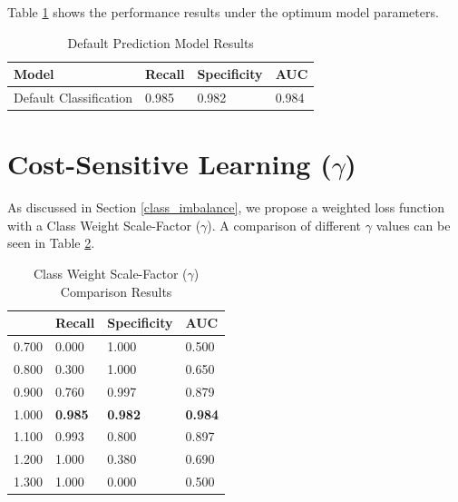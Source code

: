     Table \ref{5: best_performance } shows the performance results under the optimum model parameters.
    
    \begin{table}[H]
        \centering
        \caption{Default Prediction Model Results} \vspace{0.5cm}
        \label{5: best_performance }
            \begin{tabular}{|p{6.5cm}|p{2.5cm}|p{2.5cm}|p{2.5cm}|}
                \hline \textbf{Model} & \textbf{Recall} & \textbf{Specificity} & \textbf{AUC} \\ \hline \hline
                Default Classification & 0.985 & 0.982  & 0.984 \\ \hline
            \end{tabular}
    \end{table}
    
    
    \section{Cost-Sensitive Learning ($\gamma$)}
        As discussed in Section \ref{class_imbalance}, we propose a weighted loss function with a Class Weight Scale-Factor ($\gamma$). A comparison of different $\gamma$ values can be seen in Table \ref{5: class_weight_scale_factor}.  
        
        \begin{table}[H]
            \centering
            \caption{Class Weight Scale-Factor ($\gamma$) Comparison Results} \vspace{0.5cm}
            \label{5: class_weight_scale_factor}
                \begin{tabular}{|p{6.5cm}|p{2.5cm}|p{2.5cm}|p{2.5cm}|}
                    \hline \mathbf{$\gamma$} & \textbf{Recall} & \textbf{Specificity} & \textbf{AUC} \\ \hline \hline
                    0.700 & 0.000 & 1.000 & 0.500 \\ \hline
                    0.800 & 0.300 & 1.000 & 0.650 \\ \hline
                    0.900 & 0.760 & 0.997 & 0.879 \\ \hline
                    1.000 & \textbf{0.985} & \textbf{0.982}  & \textbf{0.984} \\ \hline
                    1.100 & 0.993 & 0.800 & 0.897 \\ \hline
                    1.200 & 1.000 & 0.380 & 0.690 \\ \hline
                    1.300 & 1.000 & 0.000 & 0.500 \\ \hline
                \end{tabular}
        \end{table}
        
